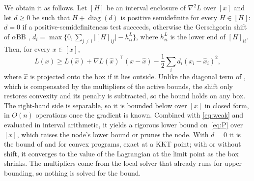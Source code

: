 \documentclass[11pt]{article}
\begin{document}
We obtain it as follows. Let $[H]$ be an interval enclosure of $\nabla^2 L$ over $[x]$
and let $d \ge 0$ be such that $H + \operatorname{diag}(d)$ is positive semidefinite
for every $H \in [H]$: $d = 0$ if a positive-semidefiniteness test succeeds, otherwise
the Gerschgorin shift of $\alpha$BB \citep{Adjiman1998a},
$d_i = \max\{0, \sum_{j \ne i} \lvert [H]_{ij} \rvert - h^L_{ii}\}$, where $h^L_{ii}$
is the lower end of $[H]_{ii}$. Then, for every $x \in [x]$,
\begin{equation}\label{eq:bound}
  L(x) \ge L(\hat x) + \nabla L(\hat x)^\top (x - \hat x)
          - \frac{1}{2} \sum_i d_i (x_i - \hat x_i)^2 ,
\end{equation}
where $\hat x$ is projected onto the box if it lies outside. Unlike the diagonal term
of \citet{Neumaier1996}, which is compensated by the multipliers of the active bounds,
the shift only restores convexity and its penalty is subtracted, so the bound holds on
any box. The right-hand side is separable, so it is bounded below over $[x]$ in closed
form, in $O(n)$ operations once the gradient is known. Combined with \eqref{eq:weak}
and evaluated in interval arithmetic, it yields a rigorous lower bound on~\eqref{eq:P}
over $[x]$, which raises the node's lower bound or prunes the node. With $d = 0$ it is
the bound of \citet{Jansson2004convex} and \citet{MessineTrombettoni2019} for convex
programs, exact at a KKT point; with or without shift, it converges to the value of the
Lagrangian at the limit point as the box shrinks. The multipliers come from the local
solver that already runs for upper bounding, so nothing is solved for the bound.
\end{document}
